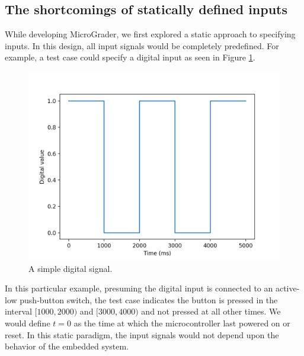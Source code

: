 \documentclass[12pt]{article}
\begin{document}
\subsection{The shortcomings of statically defined inputs}
While developing MicroGrader, we first explored a static approach to specifying inputs.  In this design, all input signals would be completely predefined.  For example, a test case could specify a digital input as seen in Figure \ref{fig:static-input}.

\begin{figure}[ht]
\centering
\includegraphics[scale=0.75]{button-signal.png}
\caption{A simple digital signal.}
\label{fig:static-input}
\end{figure}

In this particular example, presuming the digital input is connected to an active-low push-button switch, the test case indicates the button is pressed in the interval $[1000,2000)$ and $[3000,4000)$ and not pressed at all other times.  We would define $t=0$ as the time at which the microcontroller last powered on or reset.  In this static paradigm, the input signals would not depend upon the behavior of the embedded system.
\end{document}
